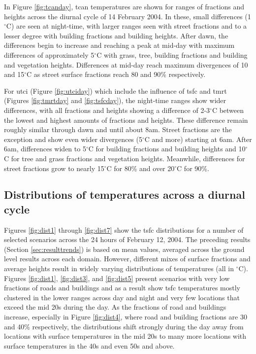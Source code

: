 \documentclass[final,3p,times,authoryear]{elsarticle}
\begin{document}
In Figure \ref{fig:tcanday}, \gls{tcan} temperatures are shown for ranges of fractions and heights across the diurnal cycle of 14 February 2004. In these, small differences (1$^{\circ}$C) are seen at night-time, with larger ranges seen with street fractions and to a lesser degree with building fractions and building heights. After dawn, the differences begin to increase and reaching a peak at mid-day with maximum differences of approximately 5$^{\circ}$C with grass, tree, building fractions and building and vegetation heights. Differences at mid-day reach maximum divergences of 10 and 15$^{\circ}$C as street surface fractions reach 80 and 90\% respectively.

For \gls{utci} (Figure \ref{fig:utciday}) which include the influence of \gls{tsfc} and \gls{tmrt} (Figures \ref{fig:tmrtday} and \ref{fig:tsfcday}), the night-time ranges show wider differences, with all fractions and heights showing a difference of 2-3$^{\circ}$C between the lowest and highest amounts of fractions and heights. These difference remain roughly similar through dawn and until about 8am. Street fractions are the exception and show even wider divergences (5$^{\circ}$C and more) starting at 6am. After 6am, differences widen to 5$^{\circ}$C for building fractions and building heights and 10$^{\circ}$C for tree and grass fractions and vegetation heights. Meanwhile, differences for street fractions grow to nearly 15$^{\circ}$C for 80\% and over 20$^{\circ}$C for 90\%.






\subsection{Distributions of temperatures across a diurnal cycle}\label{sec:resultsdist}

Figures \ref{fig:dist1} through \ref{fig:dist7} show the \gls{tsfc} distributions for a number of selected scenarios across the 24 hours of February 12, 2004. The preceding results (Section \ref{sec:resulttrends}) is based on mean values, averaged across the ground level results across each domain. However, different mixes of surface fractions and average heights result in widely varying distributions of temperatures (all in $^{\circ}$C). Figures \ref{fig:dist1}, \ref{fig:dist3}, and \ref{fig:dist5} present scenarios with very low fractions of roads and buildings and as a result show \gls{tsfc} temperatures mostly clustered in the lower ranges across day and night and very few locations that exceed the mid 20s during the day. As the fractions of road and buildings increase, especially in Figure \ref{fig:dist4}, where road and building fractions are 30 and 40\% respectively, the distributions shift strongly during the day away from locations with surface temperatures in the mid 20s to many more locations with surface temperatures in the 40s and even 50s and above.
 
\end{document}
